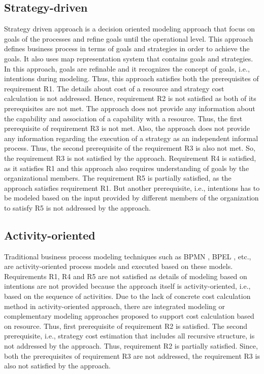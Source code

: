 \subsection{Strategy-driven} 
Strategy driven approach is a decision oriented modeling approach that focus on goals of the processes and refine goals until the operational level. This approach defines business process in terms of goals and strategies in order to achieve the goals. It also uses map representation system that contains goals and strategies. In this approach, goals are refinable and it recognizes the concept of goals, i.e., intentions during modeling. Thus, this approach satisfies both the prerequisites of requirement R1. The details about cost of a resource and strategy cost calculation is not addressed. Hence, requirement R2 is not satisfied as both of its prerequisites are not met. The approach does not provide any information about the capability and association of a capability with a resource. Thus, the first prerequisite of requirement R3 is not met. Also, the approach does not provide any information regarding the execution of a strategy as an independent informal process. Thus, the second prerequisite of the requirement R3 is also not met. So, the requirement R3 is not satisfied by the approach. Requirement R4 is satisfied, as it satisfies R1 and this approach also requires understanding of goals by the organizational members. The requirement R5 is partially satisfied, as the approach satisfies requirement R1. But another prerequisite, i.e., intentions has to be modeled based on the input provided by different members of the organization to satisfy R5 is not addressed by the approach. 

\subsection{Activity-oriented} 
Traditional business process modeling techniques such as BPMN \cite{bpm2011}, BPEL \cite{Std.2007}, etc., are activity-oriented process models and executed based on these models. Requirements R1, R4 and R5 are not satisfied as details of modeling based on intentions are not provided because the approach itself is activity-oriented, i.e., based on the sequence of activities. Due to the lack of concrete cost calculation method in activity-oriented approach, there are integrated modeling or complementary modeling approaches \cite{Bankhofer2013,Sampathkumaran2013} proposed to support cost calculation based on resource. Thus, first prerequisite of requirement R2 is satisfied. The second prerequisite, i.e., strategy cost estimation that includes all recursive structure, is not addressed by the approach. Thus, requirement R2 is partially satisfied. Since, both the prerequisites of requirement R3 are not addressed, the requirement R3 is also not satisfied by the approach. 

